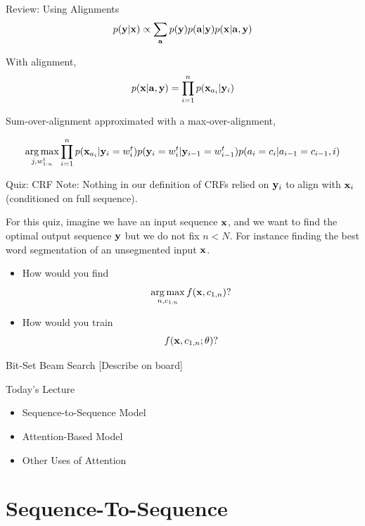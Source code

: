 \documentclass{beamer}
\begin{document}
\begin{frame}{Review: Using Alignments}
  \[ p(\mathbf{y} | \mathbf{x}) \propto \sum_{\mathbf{a}} p(\mathbf{y}) p(\mathbf{a} | \mathbf{y}) p(\mathbf{x} |  \mathbf{a}, \mathbf{y})  \]  

  With alignment,
  \[ p(\mathbf{x} |  \mathbf{a}, \mathbf{y})  = \prod_{i=1}^n p(\mathbf{x}_{a_i} | \mathbf{y}_i) \] 

  \air 

  Sum-over-alignment approximated with a max-over-alignment,

  \[ \argmax_{j, w^t_{1:n}} \prod_{i=1}^n p(\boldx_{a_i} | \boldy_i=w^t_i) p(\boldy_i=w^t_i | \boldy_{i-1}=w^t_{i-1}) p(a_i = c_i | a_{i-1}=c_{i-1}, i)   \]  
\end{frame}

\begin{frame}{Quiz: CRF}
  Note: Nothing in our definition of CRFs relied on $\mathbf{y}_i$ to align
  with $\mathbf{x}_i$ (conditioned on full sequence). 

  For this quiz, imagine we have an input sequence $\mathbf{x}$, and we want to 
  find the optimal output sequence $\mathbf{y}$ but we do not fix $n < N$. For instance 
  finding the best word segmentation of an unsegmented input $\mathbf{x}$. 

  \begin{itemize}
  \item How would you find \[ \argmax_{n, c_{1:n}} f(\boldx, c_{1,n}) ?\]

  \item How would you train \[ f(\mathbf{x}, c_{1,n}; \theta) ?\] 
  \end{itemize}
\end{frame}

\begin{frame}{Bit-Set Beam Search}
  [Describe on board] 
\end{frame}


\begin{frame}{Today's Lecture}
  \begin{itemize}
  \item Sequence-to-Sequence Model
    \air
  \item Attention-Based Model
    \air
  \item Other Uses of Attention
  \end{itemize}
\end{frame}

\section{Sequence-To-Sequence}
\end{document}
